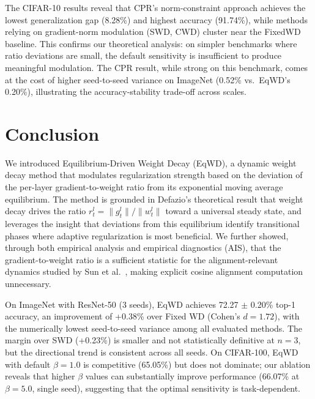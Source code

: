 \documentclass{article}
\begin{document}
The CIFAR-10 results reveal that CPR's norm-constraint approach achieves
the lowest generalization gap (8.28\%) and highest accuracy (91.74\%),
while methods relying on gradient-norm modulation (SWD, CWD) cluster
near the FixedWD baseline. This confirms our theoretical analysis: on
simpler benchmarks where ratio deviations are small, the default
sensitivity is insufficient to produce meaningful modulation. The
CPR result, while strong on this benchmark, comes at the cost of higher
seed-to-seed variance on ImageNet (0.52\% vs.\ EqWD's 0.20\%),
illustrating the accuracy-stability trade-off across scales.

\section{Conclusion}
\label{sec:conclusion}

We introduced Equilibrium-Driven Weight Decay (EqWD), a dynamic weight
decay method that modulates regularization strength based on the
deviation of the per-layer gradient-to-weight ratio from its exponential
moving average equilibrium. The method is grounded in Defazio's
\citep{defazio2025} theoretical result that weight decay drives the ratio
$r_t^l = \|g_t^l\| / \|w_t^l\|$ toward a universal steady state, and
leverages the insight that deviations from this equilibrium identify
transitional phases where adaptive regularization is most beneficial. We
further showed, through both empirical analysis and
empirical diagnostics (AIS), that the gradient-to-weight ratio is a
sufficient statistic for the alignment-relevant dynamics studied by Sun
et al.~\citep{sun2025cvpr}, making explicit cosine alignment computation
unnecessary.

On ImageNet with ResNet-50 (3 seeds),
EqWD achieves 72.27 $\pm$ 0.20\% top-1 accuracy, an improvement of
+0.38\% over Fixed WD (Cohen's $d = 1.72$), with the numerically
lowest seed-to-seed variance among all evaluated methods. The margin
over SWD (+0.23\%) is smaller and not statistically definitive at
$n = 3$, but the directional trend is consistent across all seeds. On
CIFAR-100, EqWD with default $\beta = 1.0$ is competitive (65.05\%)
but does not dominate; our ablation reveals that higher $\beta$ values
can substantially improve performance (66.07\% at $\beta = 5.0$,
single seed), suggesting that the optimal sensitivity is task-dependent.
\end{document}
